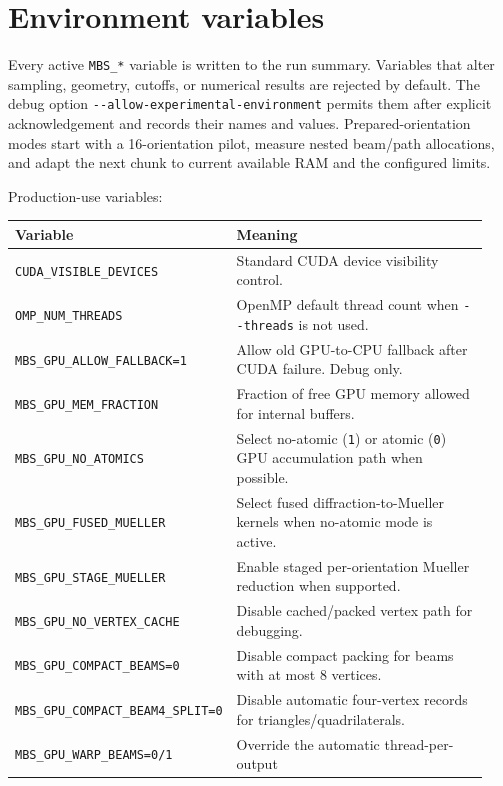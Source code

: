 \documentclass[
  10pt,
  a4paper,
]{article}
\begin{document}
\section{Environment variables}\label{environment-variables}

Every active \texttt{MBS\_*} variable is written to the run summary.
Variables that alter sampling, geometry, cutoffs, or numerical results are
rejected by default. The debug option
\texttt{-{}-allow-experimental-environment} permits them after explicit
acknowledgement and records their names and values. Prepared-orientation modes
start with a 16-orientation pilot, measure nested beam/path allocations, and
adapt the next chunk to current available RAM and the configured limits.

Production-use variables:

\begin{longtable}[]{@{}L{0.30\linewidth}L{0.64\linewidth}@{}}
\toprule\noalign{}
Variable & Meaning \\
\midrule\noalign{}
\endhead
\bottomrule\noalign{}
\endlastfoot
\texttt{CUDA\_VISIBLE\_DEVICES} & Standard CUDA device visibility
control. \\
\texttt{OMP\_NUM\_THREADS} & OpenMP default thread count when
\texttt{-\/-threads} is not used. \\
\texttt{MBS\_GPU\_ALLOW\_FALLBACK=1} & Allow old GPU-to-CPU fallback
after CUDA failure. Debug only. \\
\texttt{MBS\_GPU\_MEM\_FRACTION} & Fraction of free GPU memory allowed
for internal buffers. \\
\texttt{MBS\_GPU\_NO\_ATOMICS} & Select no-atomic (\texttt{1}) or atomic
(\texttt{0}) GPU accumulation path when possible. \\
\texttt{MBS\_GPU\_FUSED\_MUELLER} & Select fused diffraction-to-Mueller
kernels when no-atomic mode is active. \\
\texttt{MBS\_GPU\_STAGE\_MUELLER} & Enable staged per-orientation
Mueller reduction when supported. \\
\texttt{MBS\_GPU\_NO\_VERTEX\_CACHE} & Disable cached/packed vertex path
for debugging. \\
\texttt{MBS\_GPU\_COMPACT\_BEAMS=0} & Disable compact packing for beams
with at most 8 vertices. \\
\nolinkurl{MBS_GPU_COMPACT_BEAM4_SPLIT=0} & Disable automatic four-vertex
records for triangles/quadrilaterals. \\
\texttt{MBS\_GPU\_WARP\_BEAMS=0/1} & Override the automatic thread-per-output

\end{longtable}
\end{document}
